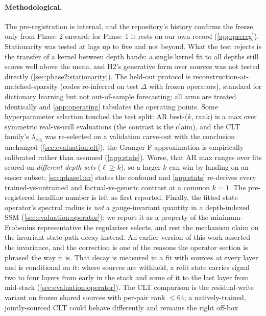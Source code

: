 \paragraph{Methodological.}
The pre-registration is internal, and the repository's history confirms the
freeze only from Phase~2 onward; for Phase~1 it rests on our own record
(\cref{app:prereg}). Stationarity was tested at lags up to five and not
beyond. What the test rejects is the transfer of a kernel between depth
bands: a single kernel fit to all depths still scores well above the mean,
and H2's generative form over sources was not tested directly
(\cref{sec:phase2:stationarity}).
The held-out protocol is reconstruction-at-matched-sparsity (codes re-inferred
on test $\Delta$ with frozen operators), standard for dictionary learning but
not out-of-sample forecasting; all arms are treated identically and
\cref{app:operating} tabulates the operating points. Some hyperparameter
selection touched the test split: AR best-($k$, rank) is a max over
symmetric real-vs-null evaluations (the contrast is the claim), and the CLT
family's $\lambda_{\mathrm{reg}}$ was re-selected on a validation carve-out
with the conclusion unchanged (\cref{sec:evaluation:clt}); the Granger F
approximation is empirically calibrated rather than assumed
(\cref{app:stats}). Worse, that AR max ranges over fits scored on
\emph{different depth sets} ($\ell \ge k$), so a larger $k$ can win by landing
on an easier subset; \cref{sec:phase1:ar} states the confound and
\cref{app:stats} re-derives every trained-vs-untrained and factual-vs-generic
contrast at a common $k{=}1$. The pre-registered headline number is left as
first reported. Finally, the fitted state operator's spectral radius is
\emph{not} a gauge-invariant quantity in a depth-indexed SSM
(\cref{sec:evaluation:operator}); we report it as a property of the
minimum-Frobenius representative the regulariser selects, and rest the
mechanism claim on the invariant state-path decay instead. An earlier version
of this work asserted the invariance, and the correction is one of the reasons
the operator section is phrased the way it is. That decay is measured in a
fit with sources at every layer and is conditional on it: where sources are
withheld, a refit state carries signal two to four layers from early in the
stack and some of it to the last layer from mid-stack
(\cref{sec:evaluation:operator}). The CLT comparison is the residual-write variant on
frozen shared sources with per-pair rank $\le 64$; a natively-trained,
jointly-sourced CLT could behave differently and remains the right off-box
